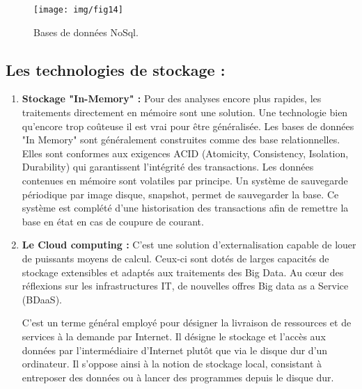 \begin{enumerate}[label=\protect\ding{\value*}, start=182,font=\color{blue}]
\begin{figure}[h]
	\centering
	\texttt{[image: img/fig14]}
	\caption{Bases de données NoSql.}
\end{figure}

\end{enumerate}

\subsection{Les technologies de stockage :}
\begin{enumerate}
\item  \textbf{Stockage "In-Memory" :}
Pour des analyses encore plus rapides, les traitements directement en mémoire sont une solution. Une technologie bien qu'encore trop coûteuse il est vrai pour être généralisée. Les bases de données "In Memory" sont généralement construites comme des base relationnelles. Elles sont conformes aux exigences ACID (Atomicity, Consistency, Isolation, Durability) qui garantissent l'intégrité des transactions. Les données contenues en mémoire sont volatiles par principe. Un système de sauvegarde périodique par image disque, snapshot, permet de sauvegarder la base. Ce système est complété d'une historisation des transactions afin de remettre la base en état en cas de coupure de courant.

\item \textbf{Le Cloud computing :}
C’est une solution d'externalisation capable de louer de puissants moyens de calcul. Ceux-ci sont dotés de larges capacités de stockage extensibles et adaptés aux traitements des Big Data. Au cœur des réflexions sur les infrastructures IT, de nouvelles offres Big data as a Service (BDaaS).

C'est un terme général employé pour désigner la livraison de ressources et de services à la demande par Internet. Il désigne le stockage et l'accès aux données par l'intermédiaire d'Internet plutôt que via le disque dur d'un ordinateur. Il s'oppose ainsi à la notion de stockage local, consistant à entreposer des données ou à lancer des programmes depuis le disque dur.

\end{enumerate}



